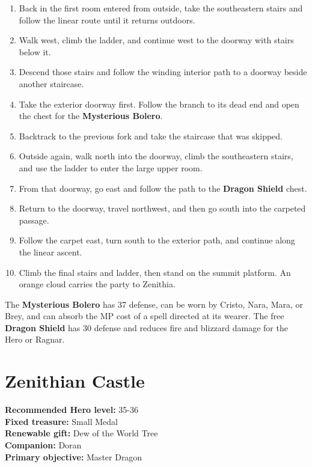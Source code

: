 \documentclass[
  american,
  10pt,
  letterpaper,
  oneside,
  open=any]{scrreprt}
\providecommand{\tightlist}{%
  \setlength{\itemsep}{0pt}\setlength{\parskip}{0pt}}
\begin{document}
\begin{enumerate}
\def\labelenumi{\arabic{enumi}.}
\setcounter{enumi}{8}
\tightlist
\item
  Back in the first room entered from outside, take the southeastern
  stairs and follow the linear route until it returns outdoors.
\item
  Walk west, climb the ladder, and continue west to the doorway with
  stairs below it.
\item
  Descend those stairs and follow the winding interior path to a doorway
  beside another staircase.
\item
  Take the exterior doorway first. Follow the branch to its dead end and
  open the chest for the \textbf{Mysterious Bolero}.
\item
  Backtrack to the previous fork and take the staircase that was
  skipped.
\item
  Outside again, walk north into the doorway, climb the southeastern
  stairs, and use the ladder to enter the large upper room.
\item
  From that doorway, go east and follow the path to the \textbf{Dragon
  Shield} chest.
\item
  Return to the doorway, travel northwest, and then go south into the
  carpeted passage.
\item
  Follow the carpet east, turn south to the exterior path, and continue
  along the linear ascent.
\item
  Climb the final stairs and ladder, then stand on the summit platform.
  An orange cloud carries the party to Zenithia.
\end{enumerate}

The \textbf{Mysterious Bolero} has 37 defense, can be worn by Cristo,
Nara, Mara, or Brey, and can absorb the MP cost of a spell directed at
its wearer. The free \textbf{Dragon Shield} has 30 defense and reduces
fire and blizzard damage for the Hero or Ragnar.

\section{Zenithian Castle}\label{zenithian-castle}

\textbf{Recommended Hero level:} 35-36\\
\textbf{Fixed treasure:} Small Medal\\
\textbf{Renewable gift:} Dew of the World Tree\\
\textbf{Companion:} Doran\\
\textbf{Primary objective:} Master Dragon
\end{document}

